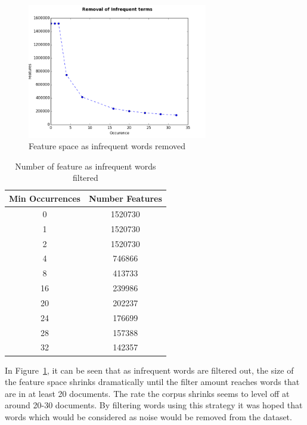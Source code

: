\begin{figure}[h]
    \centering
        \includegraphics[width=0.7\textwidth]{Figures/CorpusFilterInfrequent.png}
    \caption{Feature space as infrequent words removed}
    \label{fig:FilterInfrequent}
\end{figure}

\begin{table}[h]
    \centering
    \begin{tabular}{|c c|}
         \hline
         Min Occurrences & Number Features \\ [0.5ex]
         \hline\hline
         0 & 1520730 \\
         1 & 1520730 \\
         2 & 1520730 \\
         4 & 746866 \\
         8 & 413733 \\
         16 & 239986 \\
         20 & 202237 \\
         24 & 176699 \\
         28 & 157388 \\
         32 & 142357 \\ [1ex]
         \hline
    \end{tabular}
    \caption{Number of feature as infrequent words filtered}
    \label{table:infrequentFeatures}
\end{table}

In Figure~\ref{fig:FilterInfrequent}, it can be seen that as infrequent words are filtered out, the size of the feature space shrinks dramatically until the filter amount reaches words that are in at least 20 documents.
The rate the corpus shrinks seems to level off at around 20-30 documents.
By filtering words using this strategy it was hoped that words which would be considered as noise would be removed from the dataset.

